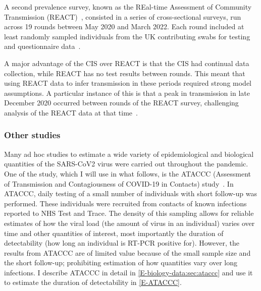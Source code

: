 \documentclass[thesis.tex]{subfiles}
\begin{document}
A second prevalence survey, known as the REal-time Assessment of Community Transmission (REACT)~\autocite{rileyResurgence,rileyREACT},
consisted in a series of cross-sectional surveys, run across 19 rounds between May 2020 and March 2022.
Each round included at least  randomly sampled individuals from the UK contributing swabs for testing and questionnaire data~\autocite{elliottTwin}.

A major advantage of the CIS over REACT is that the CIS had continual data collection, while REACT has no test results between rounds.
This meant that using REACT data to infer transmission in these periods required strong model assumptions.
A particular instance of this is that a peak in transmission in late December 2020 occurred between rounds of the REACT survey, challenging analysis of the REACT data at that time~\autocite{rileyREACTround8}.

\subsubsection{Other studies}

Many ad hoc studies to estimate a wide variety of epidemiological and biological quantities of the SARS-CoV2 virus were carried out throughout the pandemic.
One of the study, which  I will use in what follows, is the ATACCC (Assessment of Transmission and Contagiousness of COVID-19 in Contacts) study~\autocite{singanayagamCommunity,hakkiOnset}.
In ATACCC, daily testing of a small number of individuals with short follow-up was performed.
These individuals were recruited from contacts of known infections reported to NHS Test and Trace.
The density of this sampling allows for reliable estimates of how the viral load (the amount of virus in an individual) varies over time and other quantities of interest, most importantly the duration of detectability (how long an individual is RT-PCR positive for).
However, the results from ATACCC are of limited value because of the small sample size and the short follow-up; prohibiting estimation of how quantities vary over long infections.
I describe ATACCC in detail in \cref{E-biology-data:sec:ataccc} and use it to estimate the duration of detectability in \cref{E-ATACCC}.
\end{document}
